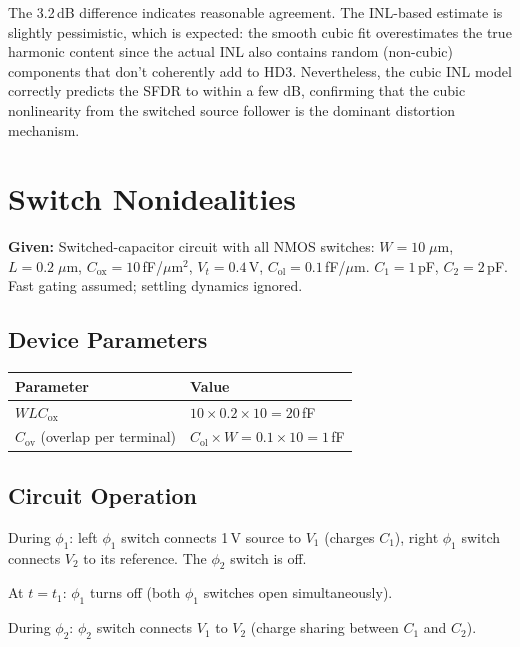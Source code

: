 \documentclass{article}
\begin{document}
The 3.2\,dB difference indicates reasonable agreement. The INL-based estimate is slightly pessimistic, which is expected: the smooth cubic fit overestimates the true harmonic content since the actual INL also contains random (non-cubic) components that don't coherently add to HD3. Nevertheless, the cubic INL model correctly predicts the SFDR to within a few dB, confirming that the cubic nonlinearity from the switched source follower is the dominant distortion mechanism.

\section{Switch Nonidealities}

\textbf{Given:} Switched-capacitor circuit with all NMOS switches: $W = 10\;\mu$m, $L = 0.2\;\mu$m, $C_\text{ox} = 10$\,fF/$\mu$m$^2$, $V_t = 0.4$\,V, $C_\text{ol} = 0.1$\,fF/$\mu$m. $C_1 = 1$\,pF, $C_2 = 2$\,pF. Fast gating assumed; settling dynamics ignored.

\subsection{Device Parameters}

\begin{table}[H]
\centering
\begin{tabular}{@{}ll@{}}
\toprule
Parameter & Value \\
\midrule
$WLC_\text{ox}$ & $10 \times 0.2 \times 10 = 20$\,fF \\
$C_\text{ov}$ (overlap per terminal) & $C_\text{ol} \times W = 0.1 \times 10 = 1$\,fF \\
\bottomrule
\end{tabular}
\end{table}

\subsection{Circuit Operation}

During $\phi_1$: left $\phi_1$ switch connects 1\,V source to $V_1$ (charges $C_1$), right $\phi_1$ switch connects $V_2$ to its reference. The $\phi_2$ switch is off.

At $t = t_1$: $\phi_1$ turns off (both $\phi_1$ switches open simultaneously).

During $\phi_2$: $\phi_2$ switch connects $V_1$ to $V_2$ (charge sharing between $C_1$ and $C_2$).
\end{document}
